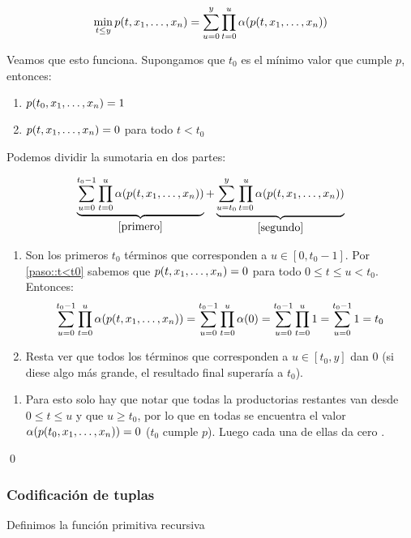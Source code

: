 \begin{demo}
 $$\min\limits_{t\leq y} p(t,x_1,\dots, x_{n}) = \sum_{u=0}^{y}\prod_{t=0}^{u}\alpha(p(t,x_1,\dots, x_{n}))$$
 
Veamos que esto funciona. Supongamos que $t_0$ es el mínimo valor que cumple $p$, entonces:
\begin{enumerate}[(1)]
	\item\label{paso::t0} $p(t_0,x_1,\dots, x_{n}) = 1$
	\item\label{paso::t<t0} $p(t,x_1,\dots, x_{n}) = 0$ para todo $t < t_0$
\end{enumerate}

Podemos dividir la sumotaria en dos partes:

$$\underbrace{\sum_{u=0}^{t_0-1}\prod_{t=0}^{u}\alpha(p(t,x_1,\dots, x_{n}))}_{\ref{primero}} + \underbrace{\sum_{u=t_0}^{y}\prod_{t=0}^{u}\alpha(p(t,x_1,\dots, x_{n}))}_{\ref{segundo}}$$
\begin{enumerate}[(1),resume]
	\item\label{primero} Son los primeros $t_0$ términos que corresponden a $u \in [0,t_0-1]$. Por \ref{paso::t<t0} sabemos que $p(t,x_1,\dots, x_{n}) = 0$ para todo $0 \leq t \leq u < t_0$. Entonces:
	$$\sum_{u=0}^{t_0-1}\prod_{t=0}^{u}\alpha(p(t,x_1,\dots, x_{n})) = 
	\sum_{u=0}^{t_0-1}\prod_{t=0}^{u}\alpha(0) = 
	\sum_{u=0}^{t_0-1}\prod_{t=0}^{u}1 = 
	\sum_{u=0}^{t_0-1}1 =
	t_0$$
	\item\label{segundo}Resta ver que todos los términos que corresponden a $u \in [t_0, y]$ dan $0$ (si diese algo más grande, el resultado final superaría a $t_0$).
\end{enumerate}
\end{demo}
\begin{demoPart}
\begin{enumerate}[resume]
	\item[]	Para esto solo hay que notar que todas la productorias restantes van desde $0 \leq t \leq u$ y que $u \geq t_0$, por lo que en todas se encuentra el valor $\alpha(p(t_0,x_1,\dots, x_{n})) = 0$ ($t_0$ cumple $p$). Luego cada una de ellas da cero .
\end{enumerate}  \qed
\end{demoPart}


\subsubsection{Codificación de tuplas}\label{secc::codTuplas}
Definimos la función primitiva recursiva

